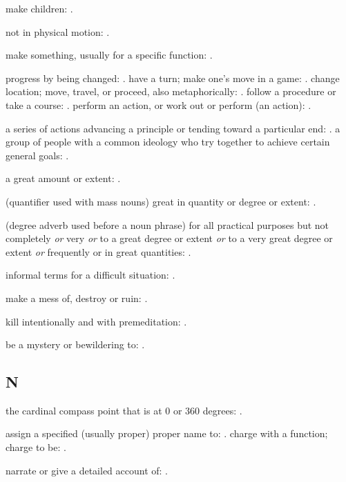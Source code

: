   make children: .

  not in physical motion: .

  make something, usually for a specific function: .

  progress by being changed: . have a turn; make one's move in a game: . change location; move, travel, or proceed, also metaphorically: . follow a procedure or take a course: . perform an action, or work out or perform (an action): .

  a series of actions advancing a principle or tending toward a particular end: . a group of people with a common ideology who try together to achieve certain general goals: .

  a great amount or extent: .

  (quantifier used with mass nouns) great in quantity or degree or extent: .

  (degree adverb used before a noun phrase) for all practical purposes but not completely \textit{or} very \textit{or} to a great degree or extent \textit{or} to a very great degree or extent \textit{or} frequently or in great quantities: .

  informal terms for a difficult situation: .

  make a mess of, destroy or ruin: .

  kill intentionally and with premeditation: .

  be a mystery or bewildering to: .

\subsection*{N}

  the cardinal compass point that is at 0 or 360 degrees: .

  assign a specified (usually proper) proper name to: . charge with a function; charge to be: .

  narrate or give a detailed account of: .

